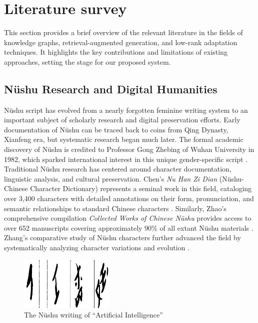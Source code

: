 \documentclass{article}
\begin{document}
\section{Literature survey}
\label{sec:lite}
    This section provides a brief overview of the relevant literature in the fields of knowledge graphs, retrieval-augmented generation, and low-rank adaptation techniques. It highlights the key contributions and limitations of existing approaches, setting the stage for our proposed system.

\subsection{N\"{u}shu Research and Digital Humanities}
\label{ssec:nushu_dh}
    N\"{u}shu script has evolved from a nearly forgotten feminine writing system to an important subject of scholarly research and digital preservation efforts. 
    Early documentation of N\"{u}shu can be traced back to coins from Qing Dynasty, Xianfeng era, but systematic research began much later. The formal academic discovery of N\"{u}shu is credited to Professor Gong Zhebing of Wuhan University in 1982, which sparked international interest in this unique gender-specific script \cite{zhao2005nushu}.
    Traditional N\"{u}shu research has centered around character documentation, linguistic analysis, and cultural preservation. Chen's \textit{Nu Han Zi Dian} (N\"{u}shu-Chinese Character Dictionary) represents a seminal work in this field, cataloging over 3,400 characters with detailed annotations on their form, pronunciation, and semantic relationships to standard Chinese characters \cite{chen2006nuhanzi}. Similarly, Zhao's comprehensive compilation \textit{Collected Works of Chinese N\"{u}shu} provides access to over 652 manuscripts covering approximately 90\% of all extant N\"{u}shu materials \cite{zhao2005nushu}. Zhang's comparative study of N\"{u}shu characters further advanced the field by systematically analyzing character variations and evolution \cite{zhang2006nushu}.
    
    \begin{figure}[htb]
    \centering
    \includegraphics[width=0.4\textwidth]{images/AI_in_nvshu.png}
    \caption{The Nüshu writing of “Artificial Intelligence”}
    \label{fig:ai_in_nvshu}
    \end{figure}
\end{document}
